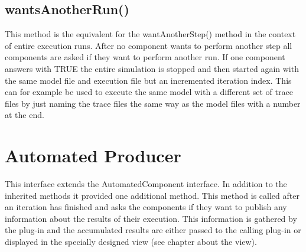 \subsection{wantsAnotherRun()}
This method is the equivalent for the wantAnotherStep() method in the context
of entire execution runs.
After no component wants to perform another step all components are asked
if they want to perform another run. If one component answers with TRUE
the entire simulation is stopped and then started again with the same
model file and execution file but an incremented iteration index.
This can for example be used to execute the same model with a different
set of trace files by just naming the trace files the same way as the
model files with a number at the end.

\section{Automated Producer}
This interface extends the AutomatedComponent interface.
In addition to the inherited methods it provided one additional method.
This method is called after an iteration has finished and asks the components
if they want to publish any information about the results of their execution.
This information is gathered by the plug-in and the accumulated results
are either passed to the calling plug-in or displayed in the
specially designed view (see chapter about the view).
